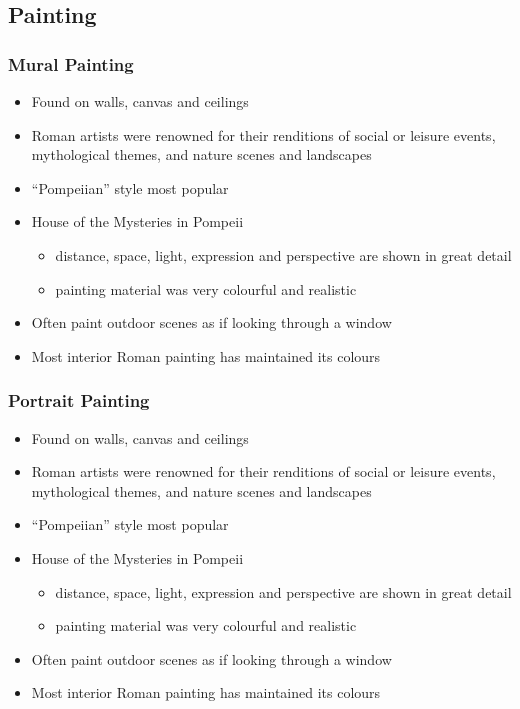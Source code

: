 \documentclass[12pt, twoside]{article}
\begin{document}
\subsection{Painting}
\subsubsection{Mural Painting}
\begin{itemize}
\item Found on walls, canvas and ceilings
\item Roman artists were renowned for their renditions of social or leisure events, mythological themes, and nature scenes and landscapes
\item “Pompeiian” style most popular
\item House of the Mysteries in Pompeii
	\begin{itemize}
	\item distance, space, light, expression and perspective are shown in great detail
	\item painting material was very colourful and realistic
	\end{itemize}
\item Often paint outdoor scenes as if looking through a window
\item Most interior Roman painting has maintained its colours
\end{itemize}

\subsubsection{Portrait Painting}
\begin{itemize}
\item Found on walls, canvas and ceilings
\item Roman artists were renowned for their renditions of social or leisure events, mythological themes, and nature scenes and landscapes
\item “Pompeiian” style most popular
\item House of the Mysteries in Pompeii
	\begin{itemize}
	\item distance, space, light, expression and perspective are shown in great detail
	\item painting material was very colourful and realistic
	\end{itemize}
\item Often paint outdoor scenes as if looking through a window
\item Most interior Roman painting has maintained its colours
\end{itemize}
\end{document}
